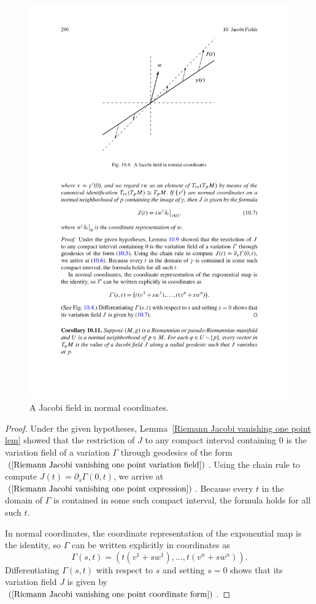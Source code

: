 \begin{figure}[htbp]
\centering
\includegraphics{pictures/Jacobi-field-normal-coordinate}
\caption{A Jacobi field in normal coordinates.}
\end{figure}
\begin{proof}
Under the given hypotheses, Lemma~\ref{Riemann Jacobi vanishing one point lem} showed that the restriction of $J$ to any compact interval containing $0$ is the 
variation field of a variation $\Gamma$ through geodesics of the form $(\ref{Riemann Jacobi vanishing one point variation field})$. Using the chain rule to compute $J(t)=\partial_s\Gamma(0,t)$, 
we arrive at $(\ref{Riemann Jacobi vanishing one point expression})$. Because every $t$ in the domain of $\Gamma$ is contained in some such compact interval, the formula holds for all such $t$.\par
In normal coordinates, the coordinate representation of the exponential map is the identity, so $\Gamma$ can be written explicitly in coordinates as
\[\Gamma(s,t)=(t(v^1+sw^1),\dots,t(v^n+sw^n)).\]
Differentiating $\Gamma(s,t)$ with respect to $s$ and setting $s=0$ shows that its variation field $J$ is given by $(\ref{Riemann Jacobi vanishing one point coordinate form})$.
\end{proof}
